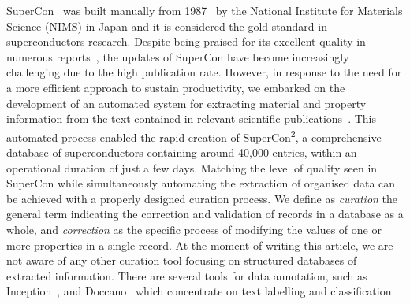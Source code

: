 \documentclass[a4paper]{article}
\begin{document}

SuperCon~\cite{SuperCon} was built manually from 1987~\cite{ishii2023structuring} by the National Institute for Materials Science (NIMS) in Japan and it is considered the gold standard in superconductors research.
Despite being praised for its excellent quality in numerous reports~\cite{roter2020predicting, stanev_machine_2017, tran2022machine, konno2021deep}, the updates of SuperCon have become increasingly challenging due to the high publication rate. 
However, in response to the need for a more efficient approach to sustain productivity, we embarked on the development of an automated system for extracting material and property information from the text contained in relevant scientific publications~\cite{lfoppiano2023automatic}. 
This automated process enabled the rapid creation of SuperCon\textsuperscript{2}, a comprehensive database of superconductors containing around 40,000 entries, within an operational duration of just a few days. 
Matching the level of quality seen in SuperCon while simultaneously automating the extraction of organised data can be achieved with a properly designed curation process. 
We define as \emph{curation} the general term indicating the correction and validation of records in a database as a whole, and \emph{correction} as the specific process of modifying the values of one or more properties in a single record. 
At the moment of writing this article, we are not aware of any other curation tool focusing on structured databases of extracted information. 
There are several tools for data annotation, such as Inception~\cite{klie-etal-2018-inception}, and Doccano~\cite{doccano} which concentrate on text labelling and classification.
\end{document}
